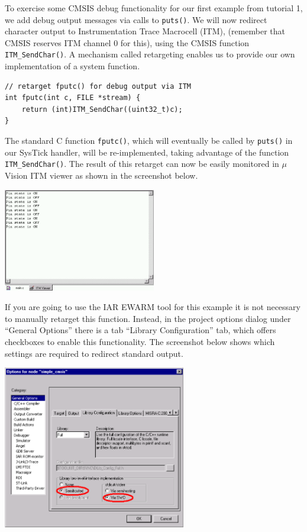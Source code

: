To exercise some CMSIS debug functionality for our first example from tutorial
1, we add debug output messages via calls to \verb|puts()|. We will now redirect
character output to Instrumentation Trace Macrocell (ITM), (remember that CMSIS
reserves ITM channel 0 for this), using the CMSIS function
\verb|ITM_SendChar()|. A mechanism called retargeting enables us to provide our
own implementation of a system function.

\begin{lstlisting}[style=cpp]
// retarget fputc() for debug output via ITM
int fputc(int c, FILE *stream) {
	return (int)ITM_SendChar((uint32_t)c);
}
\end{lstlisting}

The standard C function \verb|fputc()|, which will eventually be called by
\verb|puts()| in our SysTick handler, will be re-implemented, taking advantage
of the function \verb|ITM_SendChar()|. The result of this retarget can now be
easily monitored in $\mu$Vision ITM viewer as shown in the screenshot below.

\includegraphics[width=0.5\textwidth]{duolos_CMSIS/ITMshot.png}

If you are going to use the IAR EWARM tool for this example it is not necessary
to manually retarget this function. Instead, in the project options dialog under
“General Options” there is a tab “Library Configuration” tab, which offers
checkboxes to enable this functionality. The screenshot below shows which
settings are required to redirect standard output.

\includegraphics[width=0.6\textwidth]{duolos_CMSIS/simplecmsis.png}

